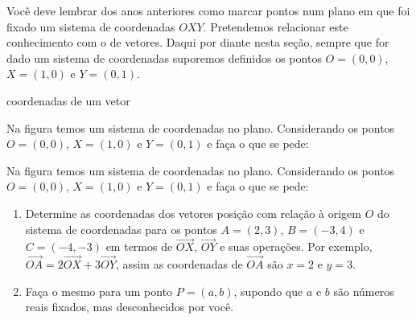 Você deve lembrar dos anos anteriores como marcar pontos num plano em que foi fixado um sistema de coordenadas \(OXY\). Pretendemos relacionar este conhecimento com o de vetores. Daqui por diante nesta seção, sempre que for dado um sistema de coordenadas suporemos definidos os pontos \(O=(0,0)\), \(X=(1,0)\) e \(Y=(0,1)\).
\begin{task}{ coordenadas de um vetor}
\label{ativ-vetores-coordenadas-vetor-posicao}



Na figura temos um sistema de coordenadas no plano. Considerando os pontos \(O=(0,0)\), \(X=(1,0)\) e \(Y=(0,1)\) e faça o que se pede:

Na figura temos um sistema de coordenadas no plano. Considerando os pontos \(O=(0,0)\), \(X=(1,0)\) e \(Y=(0,1)\) e faça o que se pede:
\begin{center}\end{center}\begin{enumerate}
\item {} 
Determine as coordenadas dos vetores posição com relação à origem \(O\) do sistema de coordenadas para os pontos \(A=(2,3)\), \(B=(-3,4)\) e \(C=(-4,-3)\) em termos de \(\overrightarrow{OX}\), \(\overrightarrow{OY}\) e suas operações. Por exemplo, \(\overrightarrow{OA}= 2 \overrightarrow{OX} + 3 \overrightarrow{OY}\), assim as coordenadas de \(\overrightarrow{OA}\) são \(x=2\) e \(y=3\).

\item {} 
Faça o mesmo para um ponto \(P=(a,b)\), supondo que \(a\) e \(b\) são números reais fixados, mas desconhecidos por você.

\end{enumerate}
\end{task}


